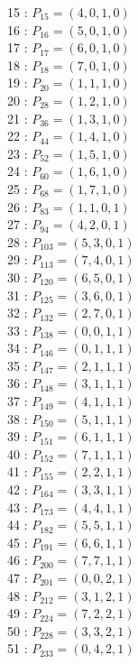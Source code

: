 \documentclass{article}
\begin{document}
{\begin{multicols}{3}
15 : $P_{15}=( 4, 0, 1, 0 )$\\
16 : $P_{16}=( 5, 0, 1, 0 )$\\
17 : $P_{17}=( 6, 0, 1, 0 )$\\
18 : $P_{18}=( 7, 0, 1, 0 )$\\
19 : $P_{20}=( 1, 1, 1, 0 )$\\
20 : $P_{28}=( 1, 2, 1, 0 )$\\
21 : $P_{36}=( 1, 3, 1, 0 )$\\
22 : $P_{44}=( 1, 4, 1, 0 )$\\
23 : $P_{52}=( 1, 5, 1, 0 )$\\
24 : $P_{60}=( 1, 6, 1, 0 )$\\
25 : $P_{68}=( 1, 7, 1, 0 )$\\
26 : $P_{83}=( 1, 1, 0, 1 )$\\
27 : $P_{94}=( 4, 2, 0, 1 )$\\
28 : $P_{103}=( 5, 3, 0, 1 )$\\
29 : $P_{113}=( 7, 4, 0, 1 )$\\
30 : $P_{120}=( 6, 5, 0, 1 )$\\
31 : $P_{125}=( 3, 6, 0, 1 )$\\
32 : $P_{132}=( 2, 7, 0, 1 )$\\
33 : $P_{138}=( 0, 0, 1, 1 )$\\
34 : $P_{146}=( 0, 1, 1, 1 )$\\
35 : $P_{147}=( 2, 1, 1, 1 )$\\
36 : $P_{148}=( 3, 1, 1, 1 )$\\
37 : $P_{149}=( 4, 1, 1, 1 )$\\
38 : $P_{150}=( 5, 1, 1, 1 )$\\
39 : $P_{151}=( 6, 1, 1, 1 )$\\
40 : $P_{152}=( 7, 1, 1, 1 )$\\
41 : $P_{155}=( 2, 2, 1, 1 )$\\
42 : $P_{164}=( 3, 3, 1, 1 )$\\
43 : $P_{173}=( 4, 4, 1, 1 )$\\
44 : $P_{182}=( 5, 5, 1, 1 )$\\
45 : $P_{191}=( 6, 6, 1, 1 )$\\
46 : $P_{200}=( 7, 7, 1, 1 )$\\
47 : $P_{201}=( 0, 0, 2, 1 )$\\
48 : $P_{212}=( 3, 1, 2, 1 )$\\
49 : $P_{224}=( 7, 2, 2, 1 )$\\
50 : $P_{228}=( 3, 3, 2, 1 )$\\
51 : $P_{233}=( 0, 4, 2, 1 )$\\

\end{multicols}}
\end{document}
